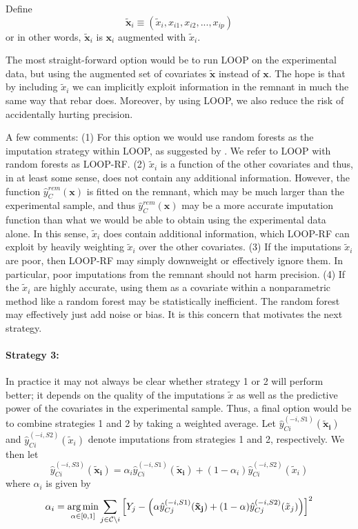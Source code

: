 Define
\begin{equation}
\tilde{\mathbf{x}}_i \equiv (\tilde{x}_{i}, x_{i1}, x_{i2}, ..., x_{ip})
\end{equation}
or in other words, $\tilde{\mathbf{x}}_i$ is $\mathbf{x}_i$ augmented with $\tilde{x}_i$.

The most straight-forward option would be to run LOOP on the experimental data, but using the augmented set of covariates $\tilde{\mathbf{x}}$ instead of $\mathbf{x}$.  The hope is that by including $\tilde{x}_{i}$ we can implicitly exploit information in the remnant in much the same way that rebar does.  Moreover, by using LOOP, we also reduce the risk of accidentally hurting precision.

A few comments:
(1) For this option we would use random forests as the imputation strategy within LOOP, as suggested by \cite{loop}.  We refer to LOOP with random forests as LOOP-RF.
(2) $\tilde{x}_{i}$ is a function of the other covariates and thus, in at least some sense, does not contain any additional information.  However, the function $\hat{y}_C^{rem}(\mathbf{x})$  is fitted on the remnant, which may be much larger than the experimental sample, and thus $\hat{y}_C^{rem}(\mathbf{x})$ may be a more accurate imputation function than what we would be able to obtain using the experimental data alone.  In this sense, $\tilde{x}_{i}$ does contain additional information, which LOOP-RF can exploit by heavily weighting $\tilde{x}_{i}$ over the other covariates.
(3) If the imputations $\tilde{x}_{i}$ are poor, then LOOP-RF may simply downweight or effectively ignore them.  In particular, poor imputations from the remnant should not harm precision.
(4) If the $\tilde{x}_{i}$ are highly accurate, using them as a covariate within a nonparametric method like a random forest may be statistically inefficient.  The random forest may effectively just add noise or bias.  It is this concern that motivates the next strategy.


\paragraph{Strategy 3:}

In practice it may not always be clear whether strategy 1 or 2 will perform better; it depends on the quality of the imputations $\tilde{x}$ as well as the predictive power of the covariates in the experimental sample.  Thus, a final option would be to combine strategies 1 and 2 by taking a weighted average.  Let $\hat{y}^{(-i, S1)}_{Ci}(\mathbf{\tilde{x}_i})$ and $\hat{y}^{(-i, S2)}_{Ci}(\tilde{x}_i)$ denote imputations from strategies 1 and 2, respectively.  We then let
\begin{equation}
\hat{y}^{(-i, S3)}_{Ci}(\mathbf{\tilde{x}_i}) = \alpha_i \hat{y}^{(-i, S1)}_{Ci}(\mathbf{\tilde{x}_i}) + (1-\alpha_i) \hat{y}^{(-i, S2)}_{Ci}(\tilde{x}_i)
\end{equation}
where $\alpha_i$ is given by
\begin{equation}
\alpha_i = \operatorname*{arg\,min}_{\alpha \in [0,1]} \sum_{j \in \mathcal{C} \setminus i} \left[Y_j - \left(\alpha \hat{y}^{(-i, S1)}_{Cj}(\mathbf{\tilde{x}_j}) + (1-\alpha) \hat{y}^{(-i, S2)}_{Cj}(\tilde{x}_j) \right)\right]^2
\end{equation}

